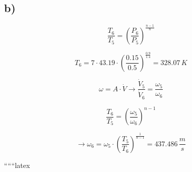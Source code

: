 

\subsection*{b)}

\[
\frac{T_6}{T_5} = \left( \frac{P_6}{P_5} \right)^{\frac{n-1}{n}}
\]

\[
T_6 = 7 \cdot 43.19 \cdot \left( \frac{0.15}{0.5} \right)^{\frac{0.9}{1.4}} = 328.07 \, K
\]

\[
\omega = A \cdot \dot{V} \rightarrow \frac{\dot{V}_5}{\dot{V}_6} = \frac{\omega_5}{\omega_6}
\]

\[
\frac{T_6}{T_5} = \left( \frac{\omega_5}{\omega_6} \right)^{n-1}
\]

\[
\rightarrow \omega_6 = \omega_5 \cdot \left( \frac{T_5}{T_6} \right)^{\frac{1}{n-1}} = 437.486 \, \frac{m}{s}
\]

``````latex